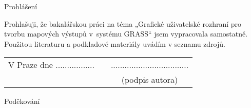 \newcommand{\odsaditodzhora}{\hskip1pt\vfill}

\odsaditodzhora
\noindent Prohlášení

Prohlašuji, že bakalářskou práci na téma „Grafické uživatelské rozhraní pro
tvorbu mapových výstupů v~systému GRASS“ jsem vypracovala samostatně. Pou\-žitou
literaturu a podkladové materiály uvádím v seznamu
zdrojů.

\begin{flushleft}
\begin{tabular}{cp{}c}
V Praze dne .................
& 
&
..................................
\\
&&
(podpis autora)
\end{tabular}

\end{flushleft}
\newpage

\odsaditodzhora
\noindent Poděkování


\newpage
